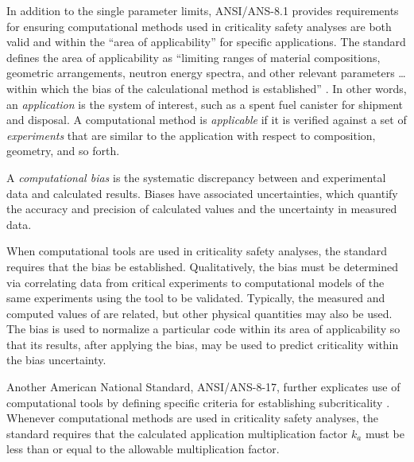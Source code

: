 In addition to the single parameter limits, ANSI/ANS-8.1 provides 
requirements for ensuring computational methods used in criticality safety 
analyses are both valid and within the ``area of applicability'' for specific 
applications. The standard defines the area of applicability as ``limiting 
ranges of material compositions, geometric arrangements, neutron energy 
spectra, and other relevant parameters \ldots within which the bias of the 
calculational method is established'' \cite{ans8_1}.  In other words, an 
\textit{application} is the system of interest, such as a spent fuel canister 
for shipment and disposal. A computational method is \textit{applicable} if 
it is verified against a set of \textit{experiments} that are similar to the 
application with respect to composition, geometry, and so forth.

A \textit{computational bias} is the systematic 
discrepancy between and experimental data and calculated results. Biases 
have associated uncertainties, which quantify the accuracy and 
precision of calculated values and the uncertainty in measured data.

When computational tools are used in criticality safety analyses, the standard
requires that the bias be established.  Qualitatively, the bias must be 
determined via correlating data from critical experiments to computational 
models of the same experiments using the tool to be validated. 
Typically, the measured and 
computed values of \keff are related, but other physical quantities may 
also be used.  The bias is used to normalize a particular code within its 
area of applicability so that its results, after applying the bias, may be 
used to predict criticality within the bias uncertainty.

Another American National Standard, ANSI/ANS-8-17, further explicates 
use of computational tools by defining specific criteria for establishing 
subcriticality \cite{ans8_17}.  Whenever computational methods are 
used in criticality safety analyses, the standard requires that the calculated 
application multiplication factor $k_a$ must be less than or equal to the 
allowable multiplication factor.

